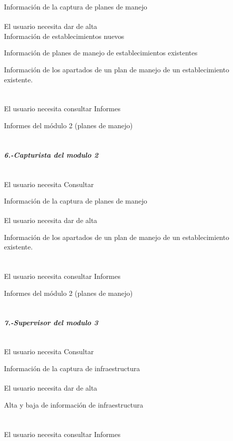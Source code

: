 \textbullet Información de la captura de planes de manejo\\\\
\textbullet El usuario necesita dar de alta\\

\textbullet Información de establecimientos nuevos

\textbullet Información de planes de manejo de establecimientos existentes

\textbullet Información de los apartados de un plan de manejo de un establecimiento existente.\\\\\\
\textbullet El usuario necesita consultar Informes

\textbullet Informes del módulo 2 (planes de manejo)\\\\\\
{\large \textit{\textbf{6.-Capturista del modulo 2}}}\\\\\\
\textbullet El usuario necesita Consultar 

\textbullet Información de la captura de planes de manejo\\\\
\textbullet El usuario necesita dar de alta

\textbullet Información de los apartados de un plan de manejo de un establecimiento existente.\\\\\\
\textbullet El usuario necesita consultar Informes

\textbullet Informes del módulo 2 (planes de manejo)\\\\\\
{\large \textit{\textbf{7.-Supervisor del modulo 3}}}\\\\\\
\textbullet El usuario necesita Consultar 

\textbullet Información de la captura de infraestructura\\\\
\textbullet El usuario necesita dar de alta

\textbullet Alta y baja de información de infraestructura\\\\\\
\textbullet El usuario necesita consultar Informes


